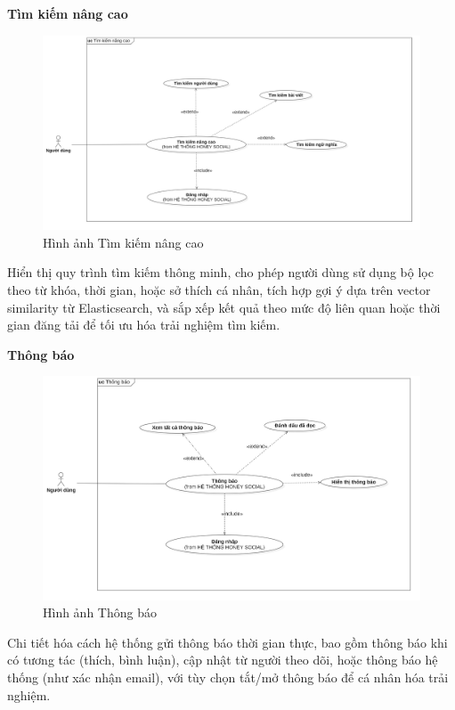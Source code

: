\textbf{Tìm kiếm nâng cao} \\
\begin{figure}[H]
    \centering
    \includegraphics[width=1\textwidth]{image/MoHinh/3.png}
    \caption{Hình ảnh Tìm kiếm nâng cao}
    \label{fig:tim_kiem_nang_cao}
\end{figure}
Hiển thị quy trình tìm kiếm thông minh, cho phép người dùng sử dụng bộ lọc theo từ khóa, thời gian, hoặc sở thích cá nhân, tích hợp gợi ý dựa trên vector similarity từ Elasticsearch, và sắp xếp kết quả theo mức độ liên quan hoặc thời gian đăng tải để tối ưu hóa trải nghiệm tìm kiếm.

\newpage
\textbf{Thông báo} \\
\begin{figure}[H]
    \centering
    \includegraphics[width=1\textwidth]{image/MoHinh/4.png}
    \caption{Hình ảnh Thông báo}
    \label{fig:thong_bao}
\end{figure}
Chi tiết hóa cách hệ thống gửi thông báo thời gian thực, bao gồm thông báo khi có tương tác (thích, bình luận), cập nhật từ người theo dõi, hoặc thông báo hệ thống (như xác nhận email), với tùy chọn tắt/mở thông báo để cá nhân hóa trải nghiệm.

